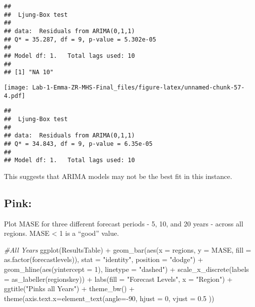 \documentclass[
]{article}
\newenvironment{Shaded}{\begin{snugshade}}{\end{snugshade}}
\newcommand{\AttributeTok}[1]{\textcolor[rgb]{0.77,0.63,0.00}{#1}}
\newcommand{\CommentTok}[1]{\textcolor[rgb]{0.56,0.35,0.01}{\textit{#1}}}
\newcommand{\DecValTok}[1]{\textcolor[rgb]{0.00,0.00,0.81}{#1}}
\newcommand{\FloatTok}[1]{\textcolor[rgb]{0.00,0.00,0.81}{#1}}
\newcommand{\FunctionTok}[1]{\textcolor[rgb]{0.00,0.00,0.00}{#1}}
\newcommand{\NormalTok}[1]{#1}
\newcommand{\SpecialCharTok}[1]{\textcolor[rgb]{0.00,0.00,0.00}{#1}}
\newcommand{\StringTok}[1]{\textcolor[rgb]{0.31,0.60,0.02}{#1}}
\begin{document}
\begin{verbatim}
## 
##  Ljung-Box test
## 
## data:  Residuals from ARIMA(0,1,1)
## Q* = 35.287, df = 9, p-value = 5.302e-05
## 
## Model df: 1.   Total lags used: 10
## 
## [1] "NA 10"
\end{verbatim}

\texttt{[image: Lab-1-Emma-ZR-MHS-Final\_files/figure-latex/unnamed-chunk-57-4.pdf]}

\begin{verbatim}
## 
##  Ljung-Box test
## 
## data:  Residuals from ARIMA(0,1,1)
## Q* = 34.843, df = 9, p-value = 6.35e-05
## 
## Model df: 1.   Total lags used: 10
\end{verbatim}

This suggests that ARIMA models may not be the best fit in this
instance.

\hypertarget{pink}{%
\subsection{Pink:}\label{pink}}

Plot MASE for three different forecast periods - 5, 10, and 20 years -
across all regions. MASE \textless{} 1 is a ``good'' value.

\begin{Shaded}
\begin{Highlighting}[]
\CommentTok{\#All Years}
\FunctionTok{ggplot}\NormalTok{(ResultsTable) }\SpecialCharTok{+} 
  \FunctionTok{geom\_bar}\NormalTok{(}\FunctionTok{aes}\NormalTok{(}\AttributeTok{x =}\NormalTok{ regions, }\AttributeTok{y =}\NormalTok{ MASE, }\AttributeTok{fill =} \FunctionTok{as.factor}\NormalTok{(forecastlevels)), }\AttributeTok{stat =} \StringTok{"identity"}\NormalTok{, }\AttributeTok{position =} \StringTok{"dodge"}\NormalTok{) }\SpecialCharTok{+} 
  \FunctionTok{geom\_hline}\NormalTok{(}\FunctionTok{aes}\NormalTok{(}\AttributeTok{yintercept =} \DecValTok{1}\NormalTok{), }\AttributeTok{linetype =} \StringTok{"dashed"}\NormalTok{) }\SpecialCharTok{+} 
  \FunctionTok{scale\_x\_discrete}\NormalTok{(}\AttributeTok{labels =} \FunctionTok{as\_labeller}\NormalTok{(regionskey)) }\SpecialCharTok{+}
  \FunctionTok{labs}\NormalTok{(}\AttributeTok{fill =} \StringTok{"Forecast Levels"}\NormalTok{, }\AttributeTok{x =} \StringTok{"Region"}\NormalTok{) }\SpecialCharTok{+} 
  \FunctionTok{ggtitle}\NormalTok{(}\StringTok{"Pinks all Years"}\NormalTok{) }\SpecialCharTok{+} \FunctionTok{theme\_bw}\NormalTok{() }\SpecialCharTok{+} \FunctionTok{theme}\NormalTok{(}\AttributeTok{axis.text.x=}\FunctionTok{element\_text}\NormalTok{(}\AttributeTok{angle=}\SpecialCharTok{{-}}\DecValTok{90}\NormalTok{, }\AttributeTok{hjust =} \DecValTok{0}\NormalTok{, }\AttributeTok{vjust =} \FloatTok{0.5}\NormalTok{ ))}
\end{Highlighting}
\end{Shaded}
\end{document}
